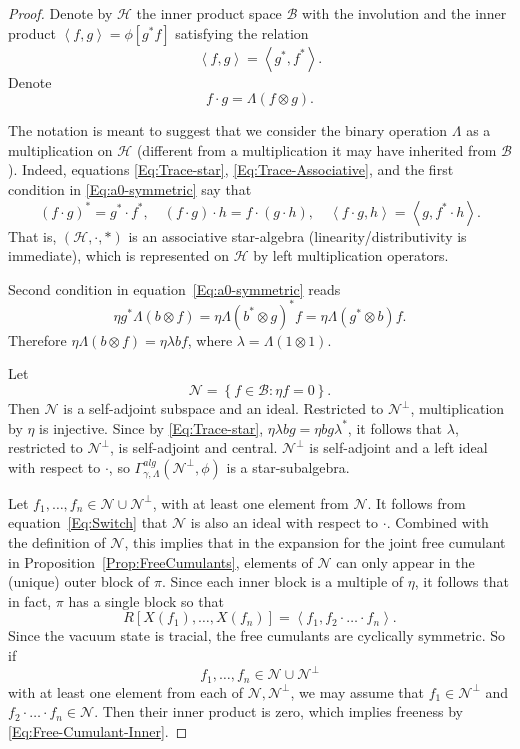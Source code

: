 \documentclass[12pt]{amsart}
\theoremstyle{definition}
\newcommand{\set}[1]{\left\{#1\right\}}
\newcommand{\mc}[1]{\mathcal{#1}}
\newcommand{\ip}[2]{\left \langle{#1},{#2} \right \rangle}
\begin{document}
\begin{proof}
Denote by $\mc{H}$ the inner product space $\mc{B}$ with the involution and the inner product $\ip{f}{g} = \phi[g^\ast f]$ satisfying the relation
\[
\ip{f}{g} = \ip{g^\ast}{f^\ast}.
\]
Denote
\begin{equation}
\label{Eq:Lambda-product}
f \cdot g = \Lambda(f \otimes g).
\end{equation}


The notation is meant to suggest that we consider the binary operation $\Lambda$ as a multiplication on $\mc{H}$ (different from a multiplication it may have inherited from $\mc{B}$). Indeed, equations \eqref{Eq:Trace-star}, \eqref{Eq:Trace-Associative}, and the first condition in \eqref{Eq:a0-symmetric} say that
\[
(f \cdot g)^\ast = g^\ast \cdot f^\ast, \quad (f \cdot g) \cdot h = f \cdot (g \cdot h), \quad \ip{f \cdot g}{h} = \ip{g}{f^\ast \cdot h}.
\]
That is, $(\mc{H}, \cdot, \ast)$ is an associative star-algebra (linearity/distributivity is immediate), which is represented on $\mc{H}$ by left multiplication operators.

Second condition in equation~\eqref{Eq:a0-symmetric} reads
\begin{equation}
\label{Eq:Switch}
\eta g^\ast \Lambda(b \otimes f) = \eta \Lambda(b^\ast \otimes g)^\ast f = \eta \Lambda(g^\ast \otimes b) f.
\end{equation}
Therefore $\eta \Lambda(b \otimes f) = \eta \lambda b f$, where $\lambda = \Lambda(1 \otimes 1)$.

Let
\[
\mc{N} = \set{ f \in \mc{B} : \eta f = 0}.
\]
Then $\mc{N}$ is a self-adjoint subspace and an ideal. Restricted to $\mc{N}^\perp$, multiplication by $\eta$ is injective. Since by \eqref{Eq:Trace-star}, $\eta \lambda b g = \eta b g \lambda^\ast$, it follows that $\lambda$, restricted to $\mc{N}^\perp$, is self-adjoint and central. $\mc{N}^\perp$ is self-adjoint and a left ideal with respect to $\cdot$, so $\Gamma^{alg}_{\gamma, \Lambda}(\mc{N}^\perp, \phi)$ is a star-subalgebra.

Let $f_1, \ldots, f_n \in \mc{N} \cup \mc{N}^\perp$, with at least one element from $\mc{N}$. It follows from equation~\eqref{Eq:Switch} that $\mc{N}$ is also an ideal with respect to $\cdot$. Combined with the definition of $\mc{N}$, this implies that in the expansion for the joint free cumulant in Proposition~\ref{Prop:FreeCumulants}, elements of $\mc{N}$ can only appear in the (unique) outer block of $\pi$. Since each inner block is a multiple of $\eta$, it follows that in fact, $\pi$ has a single block so that
\begin{equation}
\label{Eq:Free-Cumulant-Inner}
R[X(f_1), \ldots, X(f_n)] = \ip{f_1}{f_2 \cdot \ldots \cdot f_n}.
\end{equation}
Since the vacuum state is tracial, the free cumulants are cyclically symmetric. So if
\[
f_1, \ldots, f_n \in \mc{N} \cup \mc{N}^\perp
\]
with at least one element from each of $\mc{N}, \mc{N}^\perp$, we may assume that $f_1 \in \mc{N}^\perp$ and $f_2 \cdot \ldots \cdot f_n \in \mc{N}$. Then their inner product is zero, which implies freeness by \eqref{Eq:Free-Cumulant-Inner}.


\end{proof}
\end{document}
